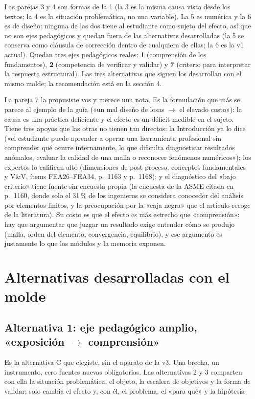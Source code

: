 \documentclass[11pt,a4paper]{article}
\begin{document}
Las parejas 3 y 4 son formas de la 1 (la 3 es la misma causa vista desde los textos; la 4 es la situación problemática, no una variable). La 5 es numérica y la 6 es de diseño: ninguna de las dos tiene al estudiante como sujeto del efecto, así que no son ejes pedagógicos y quedan fuera de las alternativas desarrolladas (la 5 se conserva como cláusula de corrección dentro de cualquiera de ellas; la 6 es la v1 actual). Quedan tres ejes pedagógicos reales: \textbf{1} (comprensión de los fundamentos), \textbf{2} (competencia de verificar y validar) y \textbf{7} (criterio para interpretar la respuesta estructural). Las tres alternativas que siguen los desarrollan con el mismo molde; la recomendación está en la sección 4.

La pareja 7 la propusiste vos y merece una nota. Es la formulación que más se parece al ejemplo de la guía («un mal diseño de losas $\to$ el elevado costo»): la causa es una práctica deficiente y el efecto es un déficit medible en el sujeto. Tiene tres apoyos que las otras no tienen tan directos: la Introducción ya lo dice («el estudiante puede aprender a operar una herramienta profesional sin comprender qué ocurre internamente, lo que dificulta diagnosticar resultados anómalos, evaluar la calidad de una malla o reconocer fenómenos numéricos»); los expertos lo califican alto (dimensiones de post-proceso, conceptos fundamentales y V\&V, ítems FEA26--FEA34, p.~1163 y p.~1168); y el diagnóstico del «bajo criterio» tiene fuente sin encuesta propia (la encuesta de la ASME citada en p.~1160, donde solo el 31\,\% de los ingenieros se considera conocedor del análisis por elementos finitos, y la preocupación por la «caja negra» que el artículo recoge de la literatura). Su costo es que el efecto es más estrecho que «comprensión»: hay que argumentar que juzgar un resultado exige entender cómo se produjo (malla, orden del elemento, convergencia, equilibrio), y ese argumento es justamente lo que los módulos y la memoria exponen.

\section{Alternativas desarrolladas con el molde}

\subsection{Alternativa 1: eje pedagógico amplio, «exposición $\to$ comprensión»}

Es la alternativa C que elegiste, sin el aparato de la v3. Una brecha, un instrumento, cero fuentes nuevas obligatorias. Las alternativas 2 y 3 comparten con ella la situación problemática, el objeto, la escalera de objetivos y la forma de validar; solo cambia el efecto y, con él, el problema, el «para qué» y la hipótesis.
\end{document}
